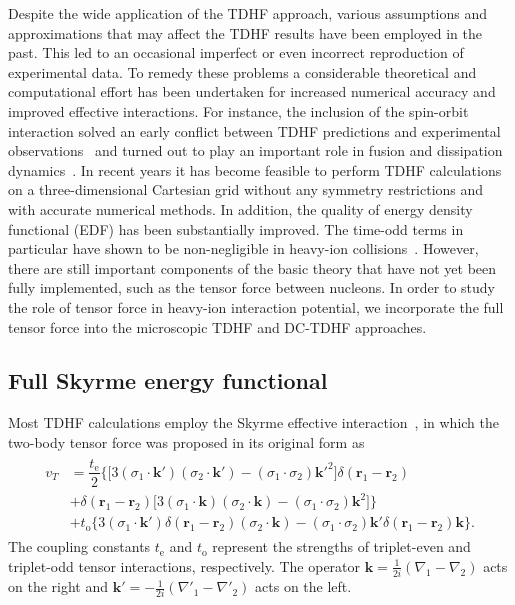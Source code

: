 Despite the wide application of the TDHF approach, various assumptions and approximations that may affect the TDHF results have been employed in the past.
This led to an occasional imperfect or even incorrect reproduction of experimental data.
To remedy these problems a considerable theoretical and computational effort has been undertaken for increased numerical accuracy
and improved effective interactions.
For instance, the inclusion of the spin-orbit interaction solved an early conflict between TDHF predictions and experimental observations~\citep{Umar1986_PRL56-2793,Umar1989_PRC40-706} and turned out to play an important role in fusion and dissipation dynamics~\citep{Maruhn2006_PRC74-027601,Dai2014_PRC90-044609}. In recent years it has become feasible
to perform TDHF calculations on a three-dimensional Cartesian grid without any symmetry restrictions and with accurate numerical methods. In
addition, the quality of energy density functional (EDF) has been substantially improved. The time-odd
terms in particular have shown to be non-negligible in heavy-ion collisions~\citep{Umar2006_PRC73-054607}. However, there are still important components of the basic theory that have not yet been fully implemented, such as the tensor force between nucleons. In order to study the role of tensor force
in heavy-ion interaction potential, we incorporate the full tensor force into the microscopic TDHF
and DC-TDHF approaches.

\subsection{Full Skyrme energy functional}

Most TDHF calculations employ the Skyrme effective interaction~\citep{Skyrme1956_PM1-1043}, in which the two-body tensor force was proposed in its original form as
\begin{align}
\begin{split}
v_T&=\dfrac{t_\mathrm{e}}{2}\bigg\{\big[3({\sigma}_\mathrm{1}\cdot\mathbf{k}')({\sigma}_\mathrm{2}\cdot\mathbf{k}')-({\sigma}_\mathrm{1}\cdot{\sigma}_\mathrm{2})\mathbf{k}'^{\mathrm{2}}\big]\delta(\mathbf{r}_\mathrm{1}-\mathbf{r}_\mathrm{2})\\
&+\delta(\mathbf{r}_\mathrm{1}-\mathbf{r}_\mathrm{2})\big[3({\sigma}_\mathrm{1}\cdot\mathbf{k})({\sigma}_\mathrm{2}\cdot\mathbf{k})-({\sigma}_\mathrm{1}\cdot{\sigma}_\mathrm{2})\mathbf{k}^\mathrm{2}\big]\bigg\}\\
&+t_\mathrm{o}\bigg\{3({\sigma}_\mathrm{1}\cdot\mathbf{k}')\delta(\mathbf{r}_\mathrm{1}-\mathbf{r}_\mathrm{2})({\sigma}_\mathrm{2}\cdot\mathbf{k})-({\sigma}_\mathrm{1}\cdot{\sigma}_\mathrm{2})\mathbf{k}'
\delta(\mathbf{r}_\mathrm{1}-\mathbf{r}_\mathrm{2})\mathbf{k}\bigg\}.
\end{split}
\end{align}
The coupling constants $t_\textrm{e}$ and $t_\textrm{o}$ represent the strengths of triplet-even and
triplet-odd tensor interactions, respectively.  The operator $\mathbf{k}=\frac{1}{2i}(\nabla_1-\nabla_2)$ acts on the right and
$\mathbf{k}'=-\frac{1}{2i}(\nabla'_1-\nabla'_2)$ acts on the left.

